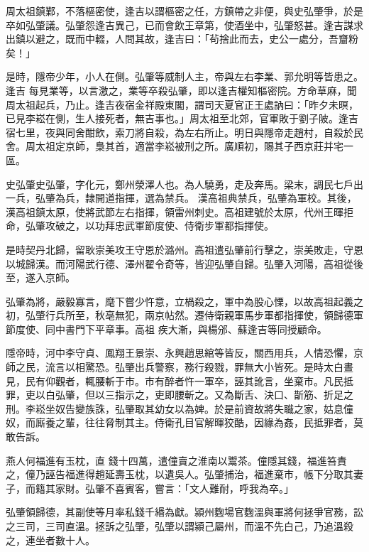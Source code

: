 \begin{pinyinscope}
 周太祖鎮鄴，不落樞密使，逢吉以謂樞密之任，方鎮帶之非便，與史弘肇爭，於是卒如弘肇議。弘肇怨逢吉異己，已而會飲王章第，使酒坐中，弘肇怒甚。逢吉謀求出鎮以避之，既而中輟，人問其故，逢吉曰：「茍捨此而去，史公一處分，吾齏粉矣！」



 是時，隱帝少年，小人在側。弘肇等威制人主，帝與左右李業、郭允明等皆患之。逢吉
 每見業等，以言激之，業等卒殺弘肇，即以逢吉權知樞密院。方命草麻，聞周太祖起兵，乃止。逢吉夜宿金祥殿東閣，謂司天夏官正王處訥曰：「昨夕未暝，已見李崧在側，生人接死者，無吉事也。」周太祖至北郊，官軍敗于劉子陂。逢吉宿七里，夜與同舍酣飲，索刀將自殺，為左右所止。明日與隱帝走趙村，自殺於民舍。周太祖定京師，梟其首，適當李崧被刑之所。廣順初，賜其子西京莊并宅一區。



 史弘肇史弘肇，字化元，鄭州滎澤人也。為人驍勇，走及奔馬。梁末，調民七戶出一兵，弘肇為兵，隸開道指揮，選為禁兵。
 漢高祖典禁兵，弘肇為軍校。其後，漢高祖鎮太原，使將武節左右指揮，領雷州刺史。高祖建號於太原，代州王暉拒命，弘肇攻破之，以功拜忠武軍節度使、侍衛步軍都指揮使。



 是時契丹北歸，留耿崇美攻王守恩於潞州。高祖遣弘肇前行擊之，崇美敗走，守恩以城歸漢。而河陽武行德、澤州翟令奇等，皆迎弘肇自歸。弘肇入河陽，高祖從後至，遂入京師。



 弘肇為將，嚴毅寡言，麾下嘗少忤意，立楇殺之，軍中為股心慄，以故高祖起義之初，弘肇行兵所至，秋亳無犯，兩京帖然。遷侍衛親軍馬步軍都指揮使，領歸德軍節度使、同中書門下平章事。高祖
 疾大漸，與楊邠、蘇逢吉等同授顧命。



 隱帝時，河中李守貞、鳳翔王景崇、永興趙思綰等皆反，關西用兵，人情恐懼，京師之民，流言以相驚恐。弘肇出兵警察，務行殺戮，罪無大小皆死。是時太白晝見，民有仰觀者，輒腰斬于市。市有醉者忤一軍卒，誣其訛言，坐棄市。凡民抵罪，吏以白弘肇，但以三指示之，吏即腰斬之。又為斷舌、決口、斮筋、折足之刑。李崧坐奴告變族誅，弘肇取其幼女以為婢。於是前資故將失職之家，姑息僮奴，而廝養之輩，往往脅制其主。侍衛孔目官解暉狡酷，因緣為姦，民抵罪者，莫敢告訴。



 燕人何福進有玉枕，直
 錢十四萬，遣僮賣之淮南以鬻茶。僮隱其錢，福進笞責之，僮乃誣告福進得趙延壽玉枕，以遺吳人。弘肇捕治，福進棄市，帳下分取其妻子，而籍其家財。弘肇不喜賓客，嘗言：「文人難耐，呼我為卒。」



 弘肇領歸德，其副使等月率私錢千緡為獻。潁州麴場官麴溫與軍將何拯爭官務，訟之三司，三司直溫。拯訴之弘肇，弘肇以謂潁己屬州，而溫不先白己，乃追溫殺之，連坐者數十人。




\end{pinyinscope}
